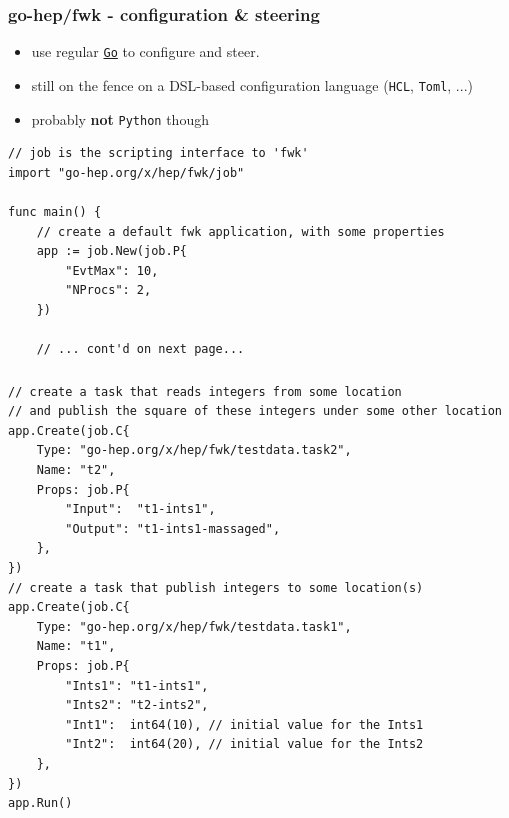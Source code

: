 \documentclass[9pt]{beamer}
\newcommand{\myblue} [1] {{\color{blue}#1}}
\begin{document}
\begin{frame}[fragile]
\frametitle{go-hep/fwk - configuration \& steering}


\begin{itemize}
\item use regular \myblue{\href{https://golang.org}{\texttt{Go}}} to configure and steer.
\item still on the fence on a DSL-based configuration language (\texttt{HCL}, \texttt{Toml}, ...)
\item probably \textbf{not} \texttt{Python} though
\end{itemize}

\begin{verbatim}
// job is the scripting interface to 'fwk'
import "go-hep.org/x/hep/fwk/job"

func main() {
	// create a default fwk application, with some properties
	app := job.New(job.P{
		"EvtMax": 10,
		"NProcs": 2,
	})

	// ... cont'd on next page...

\end{verbatim}


\end{frame}

\begin{frame}[fragile]
\frametitle{}


\begin{verbatim}
// create a task that reads integers from some location
// and publish the square of these integers under some other location
app.Create(job.C{
	Type: "go-hep.org/x/hep/fwk/testdata.task2",
	Name: "t2",
	Props: job.P{
		"Input":  "t1-ints1",
		"Output": "t1-ints1-massaged",
	},
})
// create a task that publish integers to some location(s)
app.Create(job.C{
	Type: "go-hep.org/x/hep/fwk/testdata.task1",
	Name: "t1",
	Props: job.P{
		"Ints1": "t1-ints1",
		"Ints2": "t2-ints2",
		"Int1":  int64(10), // initial value for the Ints1
		"Int2":  int64(20), // initial value for the Ints2
	},
})
app.Run()

\end{verbatim}


\end{frame}
\end{document}
